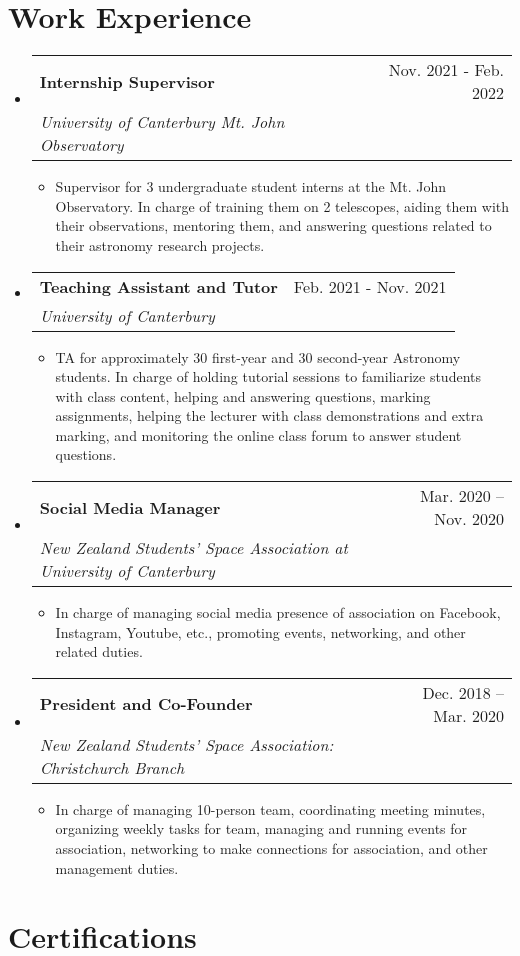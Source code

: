 \documentclass[letterpaper,11pt]{article}
\makeatletter
\newcommand{\resumeItem}[1]{
  \item\small{
    {#1 \vspace{-2pt}}
  }
}
\newcommand{\resumeSubheading}[4]{
  \vspace{-2pt}\item
    \begin{tabular*}{0.97\textwidth}[t]{l@{\extracolsep{\fill}}r}
      \textbf{#1} & #2 \\
      \textit{\small#3} & \textit{\small #4} \\
    \end{tabular*}\vspace{-7pt}
}
\newcommand{\resumeSubHeadingListStart}{\begin{itemize}[leftmargin=0.15in, label={}]}
\newcommand{\resumeSubHeadingListEnd}{\end{itemize}}
\newcommand{\resumeItemListStart}{\begin{itemize}}
\newcommand{\resumeItemListEnd}{\end{itemize}\vspace{-5pt}}
\makeatother
\begin{document}
\section{Work Experience}
\resumeSubHeadingListStart
\resumeSubheading
{Internship Supervisor}{Nov. 2021 - Feb. 2022}
{University of Canterbury Mt. John Observatory}{}
\resumeItemListStart
\resumeItem{Supervisor for 3 undergraduate student interns at the Mt. John Observatory. In charge of training them on 2 telescopes, aiding them with their observations, mentoring them, and answering questions related to their astronomy research projects.}
\resumeItemListEnd
\resumeSubheading
{Teaching Assistant and Tutor}{Feb. 2021 - Nov. 2021}
{University of Canterbury}{}
\resumeItemListStart
\resumeItem{TA for approximately 30 first-year and 30 second-year Astronomy students. In charge of holding tutorial sessions to familiarize students with class content, helping and answering questions, marking assignments, helping the lecturer with class demonstrations and extra marking, and monitoring the online class forum to answer student questions.}
\resumeItemListEnd


\resumeSubheading
{Social Media Manager}{Mar. 2020 -- Nov. 2020}
{New Zealand Students' Space Association at University of Canterbury}{}
\resumeItemListStart
\resumeItem{In charge of managing social media presence of association on Facebook, Instagram, Youtube, etc., promoting events, networking, and other related duties.}
\resumeItemListEnd
      
\resumeSubheading
{President and Co-Founder}{Dec. 2018 -- Mar. 2020}
{New Zealand Students' Space Association: Christchurch Branch}{}
\resumeItemListStart
\resumeItem{In charge of managing 10-person team, coordinating meeting minutes, organizing weekly tasks for team, managing and running events for association, networking to make connections for association, and other management duties.}
\resumeItemListEnd
\resumeSubHeadingListEnd

\section{Certifications}
\end{document}
